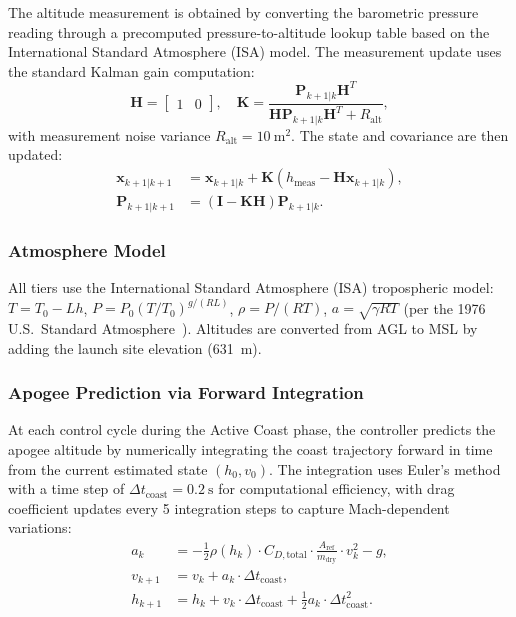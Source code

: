 \documentclass[11pt,letterpaper]{article}
\newcommand{\Cdtotal}{C_{D,\mathrm{total}}}
\newcommand{\Aref}{A_{\mathrm{ref}}}
\begin{document}
The altitude measurement is obtained by converting the barometric pressure reading through a precomputed pressure-to-altitude lookup table based on the International Standard Atmosphere (ISA) model. The measurement update uses the standard Kalman gain computation:
\begin{equation}
    \mathbf{H} = \begin{bmatrix} 1 & 0 \end{bmatrix}, \quad
    \mathbf{K} = \frac{\mathbf{P}_{k+1|k} \mathbf{H}^T}{\mathbf{H} \mathbf{P}_{k+1|k} \mathbf{H}^T + R_{\mathrm{alt}}},
    \label{eq:ekf_gain}
\end{equation}
with measurement noise variance $R_{\mathrm{alt}} = \SI{10}{\metre\squared}$. The state and covariance are then updated:
\begin{align}
    \mathbf{x}_{k+1|k+1} &= \mathbf{x}_{k+1|k} + \mathbf{K} (h_{\mathrm{meas}} - \mathbf{H} \mathbf{x}_{k+1|k}), \label{eq:ekf_state_update} \\
    \mathbf{P}_{k+1|k+1} &= (\mathbf{I} - \mathbf{K} \mathbf{H}) \mathbf{P}_{k+1|k}. \label{eq:ekf_cov_update}
\end{align}

\subsubsection{Atmosphere Model}
\label{sec:atmosphere}

All tiers use the International Standard Atmosphere (ISA) tropospheric model: $T = T_0 - Lh$, $P = P_0(T/T_0)^{g/(RL)}$, $\rho = P/(RT)$, $a = \sqrt{\gamma R T}$ (per the 1976 U.S.\ Standard Atmosphere~\cite{isa1976}). Altitudes are converted from AGL to MSL by adding the launch site elevation (\SI{631}{\metre}).

\subsubsection{Apogee Prediction via Forward Integration}
\label{sec:apogee_prediction}

At each control cycle during the Active Coast phase, the controller predicts the apogee altitude by numerically integrating the coast trajectory forward in time from the current estimated state $(h_0, v_0)$. The integration uses Euler's method with a time step of $\Delta t_{\mathrm{coast}} = \SI{0.2}{\second}$ for computational efficiency, with drag coefficient updates every 5 integration steps to capture Mach-dependent variations:
\begin{align}
    a_k &= -\frac{1}{2} \rho(h_k) \cdot \Cdtotal \cdot \frac{\Aref}{m_{\mathrm{dry}}} \cdot v_k^2 - g, \label{eq:coast_accel} \\
    v_{k+1} &= v_k + a_k \cdot \Delta t_{\mathrm{coast}}, \label{eq:coast_vel} \\
    h_{k+1} &= h_k + v_k \cdot \Delta t_{\mathrm{coast}} + \frac{1}{2} a_k \cdot \Delta t_{\mathrm{coast}}^2. \label{eq:coast_alt}
\end{align}
\end{document}
